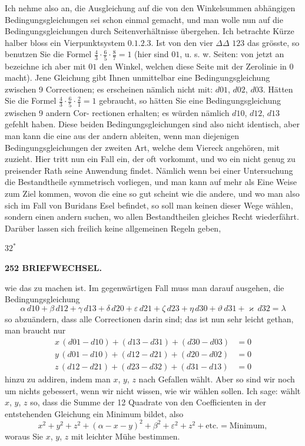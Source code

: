 \documentclass[12pt,a4paper]{article}
\theoremstyle{plain}
\theoremstyle{definition}
\theoremstyle{remark}
\begin{document}
Ich nehme also an, die Ausgleichung auf die von den Winkelsummen
abh\"angigen Bedingungsgleichungen sei schon einmal gemacht, und man wolle
nun auf die Bedingungsgleichungen durch Seitenverh\"altnisse \"ubergehen. Ich
betrachte K\"urze halber bloss ein Vierpunktsystem $0.1.2.3$. Ist von den
vier $\Delta\Delta$ $123$ das gr\"osste, so benutzen Sie die Formel $\frac{4}{3}\cdot\frac{6}{5}\cdot\frac{8}{7} = 1$ (hier
sind $01$, u. s. w. Seiten: von jetzt an bezeichne ich aber mit $01$ den Winkel,
welchen diese Seite mit der Zerolinie in $0$ macht). Jene Gleichung gibt Ihnen
unmittelbar eine Bedingungsgleichung zwischen 9 Correctionen; es erscheinen
n\"amlich nicht mit: $d01$, $d02$, $d03$. H\"atten Sie die Formel $\frac{4}{3}\cdot\frac{6}{5}\cdot\frac{2}{1} = 1$
gebraucht, so h\"atten Sie eine Bedingungsgleichung zwischen 9 andern Cor-
rectionen erhalten; es w\"urden n\"amlich $d10$, $d12$, $d13$ gefehlt haben. Diese
beiden Bedingungsgleichungen sind also nicht identisch, aber man kann die
eine aus der andern ableiten, wenn man diejenigen Bedingungsgleichungen der
zweiten Art, welche dem Viereck angeh\"oren, mit zuzieht. Hier tritt nun ein
Fall ein, der oft vorkommt, und wo ein nicht genug zu preisender Rath seine
Anwendung findet. N\"amlich wenn bei einer Untersuchung die Bestandtheile
symmetrisch vorliegen, und man kann auf mehr als Eine Weise zum Ziel
kommen, wovon die eine so gut scheint wie die andere, und wo man also
sich im Fall von Buridans Esel befindet, so soll man keinen dieser Wege
w\"ahlen, sondern einen andern suchen, wo allen Bestandtheilen gleiches Recht
wiederf\"ahrt. Dar\"uber lassen sich freilich keine allgemeinen Regeln geben,

\hfill $32^*$


\newpage

\noindent\textbf{252 BRIEFWECHSEL.}

wie das zu machen ist. Im gegenw\"artigen Fall muss man darauf ausgehen,
die Bedingungsgleichung
\[
\alpha\, d10 + \beta\, d12 + \gamma\, d13 + \delta\, d20 + \varepsilon\, d21 + \zeta\, d23 + \eta\, d30 + \vartheta\, d31 + \varkappa\, d32 = \lambda
\]
so abzu\"andern, dass alle Correctionen darin sind; das ist nun sehr leicht
gethan, man braucht nur
\begin{align*}
x\, (d01 - d10) + (d13 - d31) + (d30 - d03) &= 0 \\
y\, (d01 - d10) + (d12 - d21) + (d20 - d02) &= 0 \\
z\, (d12 - d21) + (d23 - d32) + (d31 - d13) &= 0
\end{align*}
hinzu zu addiren, indem man $x$, $y$, $z$ nach Gefallen w\"ahlt. Aber so sind wir
noch um nichts gebessert, wenn wir nicht wissen, wie wir w\"ahlen sollen. Ich
sage: w\"ahlt $x$, $y$, $z$ so, dass die Summe der 12 Quadrate von den Coefficienten
in der entstehenden Gleichung ein Minimum bildet, also
\[
x^2 + y^2 + z^2 + (\alpha - x - y)^2 + \beta^2 + \varepsilon^2 + z^2 + \text{etc.} = \text{Minimum},
\]
woraus Sie $x$, $y$, $z$ mit leichter M\"uhe bestimmen.
\end{document}

